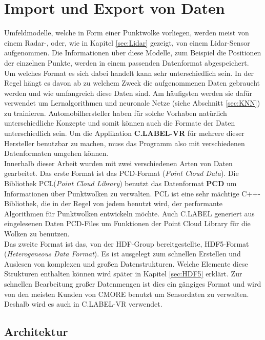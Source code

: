 \section{Import und Export von Daten}
\label{sec:ImportExport}
Umfeldmodelle, welche in Form einer Punktwolke vorliegen, werden meist von einem Radar-, oder, wie in Kapitel \ref{sec:Lidar} gezeigt, von einem Lidar-Sensor aufgenommen. Die Informationen über diese Modelle, zum Beispiel die Positionen der einzelnen Punkte, werden in einem passenden Datenformat abgespeichert. Um welches Format es sich dabei handelt kann sehr unterschiedlich sein. In der Regel hängt es davon ab zu welchem Zweck die aufgenommenen Daten gebraucht werden und wie umfangreich diese Daten sind. Am häufigsten werden sie dafür verwendet um Lernalgorithmen und neuronale Netze (siehe Abschnitt \ref{sec:KNN}) zu trainieren. Automobilhersteller haben für solche Vorhaben natürlich unterschiedliche Konzepte und somit können auch die Formate der Daten unterschiedlich sein. Um die Applikation \textbf{C.LABEL-VR} für mehrere dieser Hersteller benutzbar zu machen, muss das Programm also mit verschiedenen Datenformaten umgehen können.\\ 

Innerhalb dieser Arbeit wurden mit zwei verschiedenen Arten von Daten gearbeitet. Das erste Format ist das PCD-Format (\textit{Point Cloud Data}). Die Bibliothek PCL(\textit{Point Cloud Library}) benutzt das Datenformat \textbf{PCD} um Informationen über Punktwolken zu verwalten. PCL ist eine sehr mächtige C++-Bibliothek, die in der Regel von jedem benutzt wird, der performante Algorithmen für Punktwolken entwickeln möchte. Auch C.LABEL generiert aus eingelesenen Daten PCD-Files um Funktionen der Point Cloud Library für die Wolken zu benutzen.\\

Das zweite Format ist das, von der HDF-Group bereitgestellte, HDF5-Format (\textit{Heterogeneous Data Format}). Es ist ausgelegt zum schnellen Erstellen und Auslesen von komplexen und großen Datenstrukturen. Welche Elemente diese Strukturen enthalten können wird später in Kapitel \ref{sec:HDF5} erklärt. Zur schnellen Bearbeitung großer Datenmengen ist dies ein gängiges Format und wird von den meisten Kunden von CMORE benutzt um Sensordaten zu verwalten. Deshalb wird es auch in C.LABEL-VR verwendet.\\

\subsection{Architektur}

